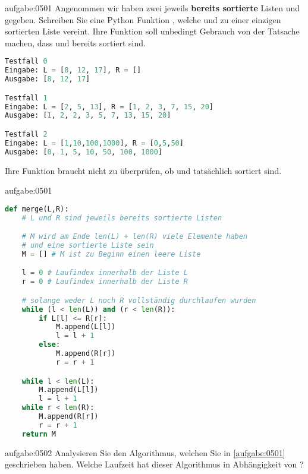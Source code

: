 \begin{aufgabe}{aufgabe:0501}
Angenommen wir haben zwei jeweils \textbf{bereits sortierte} Listen  und  gegeben. Schreiben Sie eine Python Funktion , welche  und  zu einer einzigen sortierten Liste vereint. Ihre Funktion soll unbedingt Gebrauch von der Tatsache machen, dass  und  bereits sortiert sind.
\begin{lstlisting}[language=Python,caption=Testfälle für die Funktion \pythoninline{merge}.,numbers=none]
Testfall 0
Eingabe: L = [8, 12, 17], R = []
Ausgabe: [8, 12, 17]

Testfall 1
Eingabe: L = [2, 5, 13], R = [1, 2, 3, 7, 15, 20]
Ausgabe: [1, 2, 2, 3, 5, 7, 13, 15, 20]

Testfall 2
Eingabe: L = [1,10,100,1000], R = [0,5,50]
Ausgabe: [0, 1, 5, 10, 50, 100, 1000]
\end{lstlisting}
Ihre Funktion braucht nicht zu überprüfen, ob  und  tatsächlich sortiert sind.
\end{aufgabe}
\begin{antwort}{aufgabe:0501}
\begin{lstlisting}[language=Python,caption=Implementation der Funktion \pythoninline{merge}.,label=listing:merge]
def merge(L,R):
    # L und R sind jeweils bereits sortierte Listen

    # M wird am Ende len(L) + len(R) viele Elemente haben
    # und eine sortierte Liste sein
    M = [] # M ist zu Beginn einen leere Liste

    l = 0 # Laufindex innerhalb der Liste L
    r = 0 # Laufindex innerhalb der Liste R

    # solange weder L noch R vollständig durchlaufen wurden
    while (l < len(L)) and (r < len(R)):
        if L[l] <= R[r]:
            M.append(L[l])
            l = l + 1
        else:
            M.append(R[r])
            r = r + 1

    while l < len(L):
        M.append(L[l])
        l = l + 1
    while r < len(R):
        M.append(R[r])
        r = r + 1
    return M
\end{lstlisting}     
\end{antwort}

\begin{aufgabe}{aufgabe:0502}
Analysieren Sie den Algorithmus, welchen Sie in \cref{aufgabe:0501} geschrieben haben. Welche Laufzeit hat dieser Algorithmus in Abhängigkeit von ?
\end{aufgabe}

